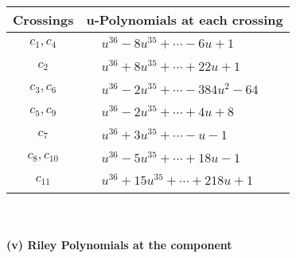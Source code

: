 \documentclass[1p]{elsarticle_modified}
\theoremstyle{definition}
\begin{document}
\begin{tabular}{m{50pt}|m{274pt}}
Crossings & \hspace{64pt}u-Polynomials at each crossing \\
\hline $$\begin{aligned}c_{1},c_{4}\end{aligned}$$&$\begin{aligned}
&u^{36}-8 u^{35}+\cdots-6 u+1
\end{aligned}$\\
\hline $$\begin{aligned}c_{2}\end{aligned}$$&$\begin{aligned}
&u^{36}+8 u^{35}+\cdots+22 u+1
\end{aligned}$\\
\hline $$\begin{aligned}c_{3},c_{6}\end{aligned}$$&$\begin{aligned}
&u^{36}-2 u^{35}+\cdots-384 u^2-64
\end{aligned}$\\
\hline $$\begin{aligned}c_{5},c_{9}\end{aligned}$$&$\begin{aligned}
&u^{36}-2 u^{35}+\cdots+4 u+8
\end{aligned}$\\
\hline $$\begin{aligned}c_{7}\end{aligned}$$&$\begin{aligned}
&u^{36}+3 u^{35}+\cdots- u-1
\end{aligned}$\\
\hline $$\begin{aligned}c_{8},c_{10}\end{aligned}$$&$\begin{aligned}
&u^{36}-5 u^{35}+\cdots+18 u-1
\end{aligned}$\\
\hline $$\begin{aligned}c_{11}\end{aligned}$$&$\begin{aligned}
&u^{36}+15 u^{35}+\cdots+218 u+1
\end{aligned}$\\
\hline
\end{tabular}\\~\\
\newpage\renewcommand{\arraystretch}{1}
\flushleft \textbf{(v) Riley Polynomials at the component}\newline \\
\end{document}
